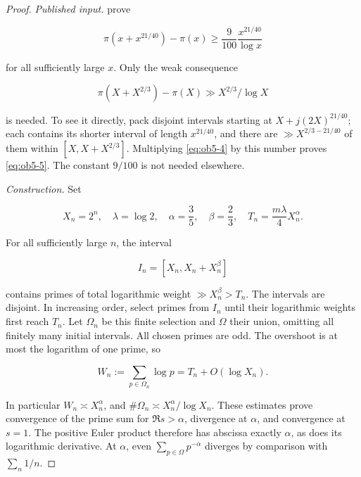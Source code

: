 \begin{proof}\textit{Published input.} \citet[p.~562, final displayed estimate]{bhp2001} prove

\begin{equation}\label{eq:ob5-4}
\pi(x+x^{21/40})-\pi(x)
\ge\frac9{100}\frac{x^{21/40}}{\log x}
\end{equation}

for all sufficiently large \(x\). Only the weak consequence

\begin{equation}\label{eq:ob5-5}
\pi(X+X^{2/3})-\pi(X)\gg X^{2/3}/\log X
\end{equation}

is needed. To see it directly, pack disjoint intervals starting at \(X+j(2X)^{21/40}\); each contains its shorter interval of length \(x^{21/40}\), and there are \(\gg X^{2/3-21/40}\) of them within \([X,X+X^{2/3}]\). Multiplying \eqref{eq:ob5-4} by this number proves \eqref{eq:ob5-5}. The constant \(9/100\) is not needed elsewhere.

\textit{Construction.} Set

\begin{equation}\label{eq:ob5-6}
X_n=2^n,\quad \lambda=\log2,\quad
\alpha=\frac35,\quad\beta=\frac23,
\quad T_n=\frac{m\lambda}{4}X_n^\alpha.
\end{equation}

For all sufficiently large \(n\), the interval

\begin{equation}\label{eq:ob5-7}
I_n=[X_n,X_n+X_n^\beta]
\end{equation}

contains primes of total logarithmic weight \(\gg X_n^\beta>T_n\). The intervals are disjoint. In increasing order, select primes from \(I_n\) until their logarithmic weights first reach \(T_n\). Let \(\Omega_n\) be this finite selection and \(\Omega\) their union, omitting all finitely many initial intervals. All chosen primes are odd. The overshoot is at most the logarithm of one prime, so

\begin{equation}\label{eq:ob5-8}
W_n:=\sum_{p\in\Omega_n}\log p
=T_n+O(\log X_n).
\end{equation}

In particular \(W_n\asymp X_n^\alpha\), and \(\#\Omega_n\asymp X_n^\alpha/\log X_n\). These estimates prove convergence of the prime sum for \(\Re s>\alpha\), divergence at \(\alpha\), and convergence at \(s=1\). The positive Euler product therefore has abscissa exactly \(\alpha\), as does its logarithmic derivative. At \(\alpha\), even \(\sum_{p\in\Omega}p^{-\alpha}\) diverges by comparison with \(\sum_n1/n\).


\end{proof}
